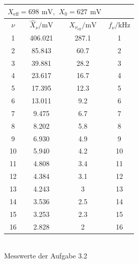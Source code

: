 \documentclass[a4paper, 12pt]{article}
\begin{document}
  \subsection{}
  \begin{center}
    \bgroup
    \def\arraystretch{1.6180339887498948}
      \begin{tabular}{@{}cccc@{}}
      \toprule
      \multicolumn{3}{c}{$X_{\text{eff}}=698
      \,\ \si{\milli\volt}, \,\ X_0 = 627 \,\ \si{\milli\volt}$} \\ \midrule
      $\nu$      & $\hat{X}_\nu / \si{\milli\volt}$   & $X_{\nu_{\text{eff}}} / \si{\milli\volt}$ & $f_\nu / \si{\kilo\hertz}$ \\ \hline
        1  & 406.021 & 287.1 & 1        \\
        2  & 85.843  & 60.7  & 2        \\
        3  & 39.881  & 28.2  & 3        \\
        4  & 23.617  & 16.7  & 4        \\
        5  & 17.395  & 12.3  & 5        \\
        6  & 13.011  & 9.2   & 6        \\
        7  & 9.475   & 6.7   & 7        \\
        8  & 8.202   & 5.8   & 8        \\
        9  & 6.930   & 4.9   & 9        \\
        10 & 5.940   & 4.2   & 10       \\
        11 & 4.808   & 3.4   & 11       \\
        12 & 4.384   & 3.1   & 12       \\
        13 & 4.243   & 3     & 13       \\
        14 & 3.536   & 2.5   & 14       \\
        15 & 3.253   & 2.3   & 15       \\
        16 & 2.828   & 2     & 16       \\ \bottomrule
      \end{tabular}\\
      Messwerte der Aufgabe 3.2\\
      \egroup
    \end{center}


  \subsection{}
\end{document}
